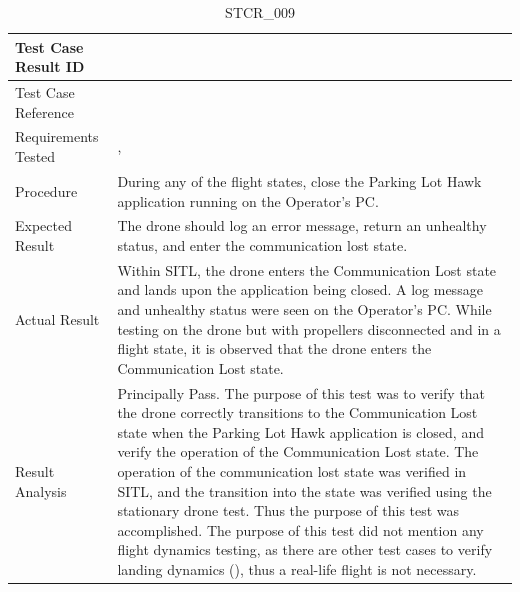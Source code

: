 \documentclass[12pt, titlepage]{article}
\begin{document}
\begin{table}[!h]
\begin{center}
\caption {STCR\_009}
\label{tab:STCR_009}
\begin{tabular}{ | m{3.2cm} | m{12.2cm} | } 
\hline
Test Case Result ID & \nameref{tab:STCR_009} \\ 
\hline
Test Case Reference & \nameref{tab:STC_009}  \\ 
\hline
Requirements Tested & \nameref{STA_010}, \nameref{TRANS_010} 

\\  
\hline
Procedure & During any of the flight states, close the Parking Lot Hawk application running on the Operator's PC.     \\ 
\hline
Expected Result & The drone should log an error message, return an unhealthy status, and enter the communication lost state.   \\ 
\hline
Actual Result & Within SITL, the drone enters the Communication Lost state and lands upon the application being closed. A log message and unhealthy status were seen on the Operator's PC. While testing on the drone but with propellers disconnected and in a flight state, it is observed that the drone enters the Communication Lost state.  \\ 
\hline
Result Analysis & Principally Pass. The purpose of this test was to verify that the drone correctly transitions to the Communication Lost state when the Parking Lot Hawk application is closed, and verify the operation of the Communication Lost state. The operation of the communication lost state was verified in SITL, and the transition into the state was verified using the stationary drone test. Thus the purpose of this test was accomplished. The purpose of this test did not mention any flight dynamics testing, as there are other test cases to verify landing dynamics (\nameref{tab:STCR_003}), thus a real-life flight is not necessary.   \\ 
\hline
\end{tabular}
\end{center}
\end{table}
\end{document}
